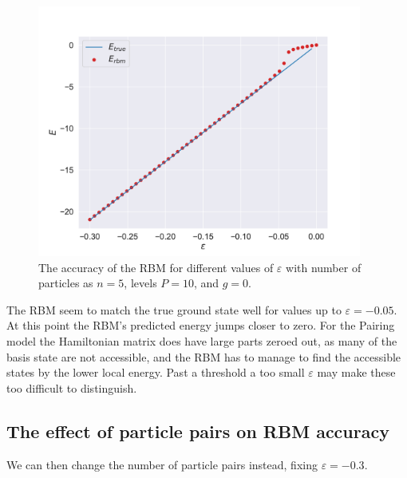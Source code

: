 \begin{figure}[H]
  \begin{center}
    \includegraphics[width=0.95\textwidth]{Figures/Plots/Pairing/val-true[eps][-0.3-0.0][e=1000][n=10][n=5][g=0]}
  \end{center}
  \caption{The accuracy of the RBM for different values of $\varepsilon$ with number of particles as $n = 5$, levels $P=10$, and $g=0$.}
\end{figure}

The RBM seem to match the true ground state well for values up to $\varepsilon = -0.05$. At this point the RBM's predicted energy jumps closer to zero. For the Pairing model the Hamiltonian matrix does have large parts zeroed out, as many of the basis state are not accessible, and the RBM has to manage to find the accessible states by the lower local energy. Past a threshold a too small $\varepsilon$ may make these too difficult to distinguish.

\subsection{The effect of particle pairs on RBM accuracy}

We can then change the number of particle pairs instead, fixing $\varepsilon = -0.3$.

